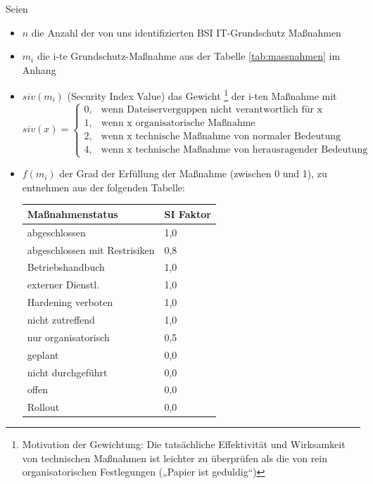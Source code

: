 Seien
\begin{itemize}
\item $n$ die Anzahl der von uns identifizierten BSI IT-Grundschutz Maßnahmen
\item $m_i$ die i-te Grundschutz-Maßnahme aus der Tabelle \ref{tab:massnahmen} im Anhang
\item $siv(m_i)$ (Security Index Value) das Gewicht \footnote{Motivation der Gewichtung: Die tatsächliche Effektivität und Wirksamkeit von technischen Maßnahmen ist leichter zu überprüfen als die von rein organisatorischen Festlegungen („Papier ist geduldig“)} der i-ten Maßnahme mit
\begin{equation}
siv(x)=
\begin{cases}
    0,& \text{wenn Dateiserverguppen nicht verantwortlich für x }\\
    1,& \text{wenn x organisatorische Maßnahme}\\
    2,& \text{wenn x technische Maßnahme von normaler Bedeutung}\\
    4,& \text{wenn x technische Maßnahme von herausragender Bedeutung}
\end{cases}
\end{equation}
\item $f(m_i)$ der Grad der Erfüllung der Maßnahme (zwischen 0 und 1), zu entnehmen aus der folgenden Tabelle: \\

\begin{minipage}{\textwidth}
\begin{center}
\begin{tabular}{ll}
\toprule
Maßnahmenstatus & SI Faktor \\
\midrule
abgeschlossen & 1,0 \\
abgeschlossen mit Restrisiken & 0,8 \\
Betriebshandbuch & 1,0 \\
externer Dienstl. & 1,0 \\
Hardening verboten & 1,0 \\
nicht zutreffend & 1,0 \\
nur organisatorisch & 0,5 \\
geplant & 0,0 \\
nicht durchgeführt & 0,0 \\
offen & 0,0 \\
Rollout & 0,0  \\
\bottomrule
\end{tabular}
\end{center}
\end{minipage}
\end{itemize}
\bigskip

